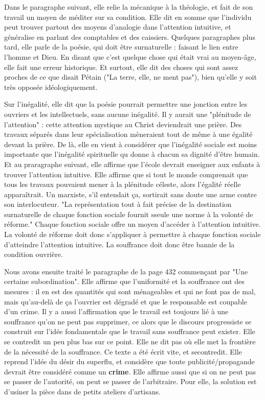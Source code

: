 \documentclass[a4paper,12pt]{book}
\begin{document}
\par Dans le paragraphe suivant, elle relie la mécanique à la théologie, et fait de son travail un moyen de méditer sur sa condition. Elle dit en somme que l'individu peut trouver partout des moyens d'analogie dans l'attention intuitive, et généralise en parlant des comptables et des caissiers. Quelques paragraphes plus tard, elle parle de la poésie, qui doit être surnaturelle : faisant le lien entre l'homme et Dieu. En disant que c'est quelque chose qui était vrai au moyen-âge, elle fait une erreur historique. Et surtout, elle dit des choses qui sont assez proches de ce que disait Pétain ("La terre, elle, ne ment pas"), bien qu'elle y soit très opposée idéologiquement.
\par Sur l'inégalité, elle dit que la poésie pourrait permettre une jonction entre les ouvriers et les intellectuels, sans aucune inégalité. Il y aurait une "plénitude de l'attention" : cette attention mystique au Christ deviendrait une prière. Des travaux séparés dans leur spécialisation mèneraient tout de même à une égalité devant la prière. De là, elle en vient à considérer que l'inégalité sociale est moins importante que l'inégalité spirituelle qu donne à chacun sa dignité d'être humain. Et au praragraphe suivant, elle affirme que l'école devrait enseigner aux enfants à trouver l'attention intuitive. Elle affirme que si tout le monde comprenait que tous les travaux pouvaient mener à la plénitude céleste, alors l'égalité réelle apparaîtrait. Un marxiste, s'il entendait ça, sortirait sans doute une arme contre son interlocuteur. "La représentation tout à fait précise de la destination surnaturelle de chaque fonction sociale fournit sseule une norme à la volonté de réforme." Chaque fonction sociale offre un moyen d'accéder à l'attention intuitive. La volonté de réforme doit donc s'appliquer à permettre à chaque fonction sociale d'atteindre l'attention intuitive. La souffrance doit donc être bannie de la condition ouvrière.
\par Nous avons ensuite traité le paragraphe de la page 432 commençant par "Une certaine subordination". Elle affirme que l'uniformité et la souffrance ont des mesures : il en est des quantités qui sont ménageables et qui ne font pas de mal, mais qu'au-delà de ça l'ouvrier est dégradé et que le responsable est coupable d'un crime. Il y a aussi l'affirmation que le travail est toujours lié à une souffrance qu'on ne peut pas supprimer, ce alors que le discours progressiste se construit sur l'idée fondamentale que le travail sans souffrance peut exister. Elle se contredit un peu plus bas sur ce point. Elle ne dit pas où elle met la frontière de la nécessité de la souffrance. Ce texte a été écrit vite, et secontredit. Elle reprend l'idée du désir du superflu, et considère que toute publicité/propagande devrait être considéré comme un \textbf{crime}. Elle affirme aussi que si on ne peut pas se passer de l'autorité, on peut se passer de l'arbitraire. Pour elle, la solution est d'usiner la pièce dans de petits ateliers d'artisans.
\end{document}
